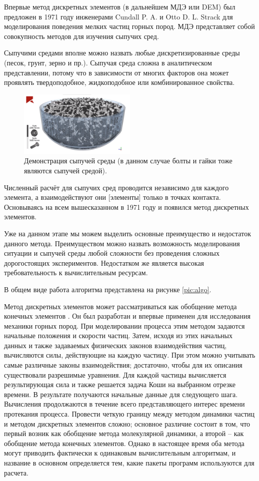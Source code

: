 \documentclass[utf8x, 14pt, oneside, a4paper]{article}
\begin{document}
Впервые метод дискретных элементов (в дальнейшем МДЭ или DEM) был предложен в 1971 году инженерами Cundall P. A. и Otto D. L. Strack \cite{cundall} для моделирования поведения мелких частиц горных пород. 
МДЭ представляет собой совокупность методов для изучения сыпучих сред. 

Сыпучими средами вполне можно назвать любые дискретизированные среды (песок, грунт, зерно и пр.). 
Сыпучая среда сложна в аналитическом представлении, потому что в зависимости от многих факторов она может проявлять твердоподобное, жидкоподобное или комбинированное свойства. 

\begin{figure}[H]
	\centering
	\includegraphics[width=0.5\textwidth]{sreda}
	\caption{Демонстрация сыпучей среды (в данном случае болты и гайки тоже являются сыпучей средой).}
\end{figure} 

Численный расчёт для сыпучих сред проводится независимо для каждого элемента, а взаимодействуют они [элементы] только в точках контакта. 
Основываясь на всем вышесказанном в 1971 году и появился метод дискретных элементов.

Уже на данном этапе мы можем выделить основные преимущество и недостаток данного метода. 
Преимуществом можно назвать возможность моделирования ситуации и сыпучей среды любой сложности без проведения сложных дорогостоящих экспериментов. 
Недостатком же является высокая требовательность к вычислительным ресурсам.

В общем виде работа алгоритма представлена на рисунке \ref{pic:algo}.

Метод дискретных элементов может рассматриваться как обобщение метода конечных элементов \cite{mde_smth}.
Он был разработан и впервые применен для исследования механики горных пород. 
При моделировании процесса этим методом задаются начальные положения и скорости частиц. 
Затем, исходя из этих начальных данных и также задаваемых физических законов взаимодействия частиц, вычисляются силы, действующие на каждую частицу. 
При этом можно учитывать самые различные законы взаимодействия; достаточно, чтобы для их описания существовали разрешимые уравнения. 
Для каждой частицы вычисляется результирующая сила и также решается задача Коши на выбранном отрезке времени. 
В результате получаются начальные данные для следующего шага.
Вычисления продолжаются в течение всего представляющего интерес времени протекания процесса. 
Провести четкую границу между методом динамики частиц и методом дискретных элементов сложно; основное различие состоит в том, что первый возник как обобщение метода молекулярной динамики, а второй – как обобщение метода конечных элементов. 
Однако в настоящее время оба метода могут приводить фактически к одинаковым вычислительным алгоритмам, и название в основном определяется тем, какие пакеты программ используются для расчета.
\end{document}
